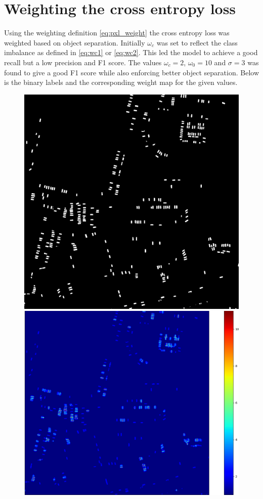 \documentclass{kththesis}
\begin{document}
\section{Weighting the cross entropy loss}
Using the weighting definition \ref{eq:pxl_weight} the cross entropy loss was weighted based on object separation. Initially $\omega_c$ was set to reflect the class imbalance as defined in \eqref{eq:wc1} or \eqref{eq:wc2}. This led the model to achieve a good recall but a low precision and F1 score. The values $\omega_c =2$, $\omega_0=10$ and $\sigma=3$ was found to give a good F1 score while also enforcing better object separation. Below is the binary labels and the corresponding weight map for the given values.
\begin{figure}[H]
\centering
{}
  \includegraphics[width=\linewidth]{weight_labels}
\endminipage\hfill
{}
  \includegraphics[width=\linewidth]{weight_map_3}

\end{figure}
\end{document}

